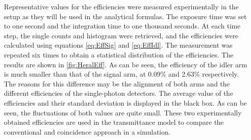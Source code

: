 Representative values for the efficiencies were measured experimentally in the setup as they will be used in the analytical formulas. The exposure time was set to one second and the integration time to one thousand seconds. At each time step, the single counts and histogram were retrieved, and the efficiencies were calculated using equations \ref{eq:EffSig} and \ref{eq:EffIdl}. The measurement was repeated six times to obtain a statistical distribution of the efficiencies. The results are shown in \autoref{fig:HeralEff}. \newline
As can be seen, the efficiency of the idler arm is much smaller than that of the signal arm, at 0.09\% and 2.63\% respectively. The reasons for this difference may be the alignment of both arms and the different efficiencies of the single-photon detectors. The average value of the efficiencies and their standard deviation is displayed in the black box. As can be seen, the fluctuations of both values are quite small. \newline
These two experimentally obtained efficiencies are used in the transmittance model to compare the conventional and coincidence approach in a simulation.



